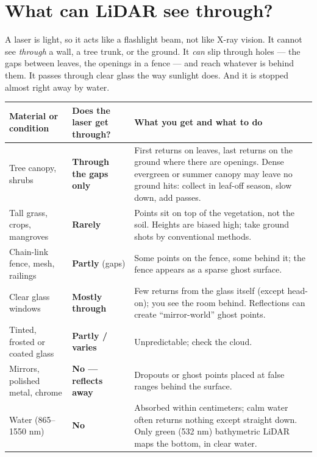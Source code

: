 \section{What can LiDAR see through?}
\begin{kid}
A laser is light, so it acts like a flashlight beam, not like X-ray vision. It cannot see \emph{through} a wall, a tree trunk, or the ground. It \emph{can} slip through holes --- the gaps between leaves, the openings in a fence --- and reach whatever is behind them. It passes through clear glass the way sunlight does. And it is stopped almost right away by water.
\end{kid}


\begin{center}\small
\renewcommand{\arraystretch}{1.2}
\begin{tabularx}{\linewidth}{>{\raggedright\arraybackslash}p{3.0cm}>{\raggedright\arraybackslash}p{2.2cm}X}\toprule
\textbf{Material or condition} & \textbf{Does the laser get through?} & \textbf{What you get and what to do}\\\midrule
Tree canopy, shrubs & \textbf{Through the gaps only} & First returns on leaves, last returns on the ground where there are openings. Dense evergreen or summer canopy may leave no ground hits: collect in leaf-off season, slow down, add passes.\\
Tall grass, crops, mangroves & \textbf{Rarely} & Points sit on top of the vegetation, not the soil. Heights are biased high; take ground shots by conventional methods.\\
Chain-link fence, mesh, railings & \textbf{Partly} (gaps) & Some points on the fence, some behind it; the fence appears as a sparse ghost surface.\\
Clear glass windows & \textbf{Mostly through} & Few returns from the glass itself (except head-on); you see the room behind. Reflections can create ``mirror-world'' ghost points.\\
Tinted, frosted or coated glass & \textbf{Partly / varies} & Unpredictable; check the cloud.\\
Mirrors, polished metal, chrome & \textbf{No --- reflects away} & Dropouts or ghost points placed at false ranges behind the surface.\\
Water (865--1550 nm) & \textbf{No} & Absorbed within centimeters; calm water often returns nothing except straight down. Only green (532 nm) bathymetric LiDAR maps the bottom, in clear water.\\

\end{tabularx}
\end{center}
